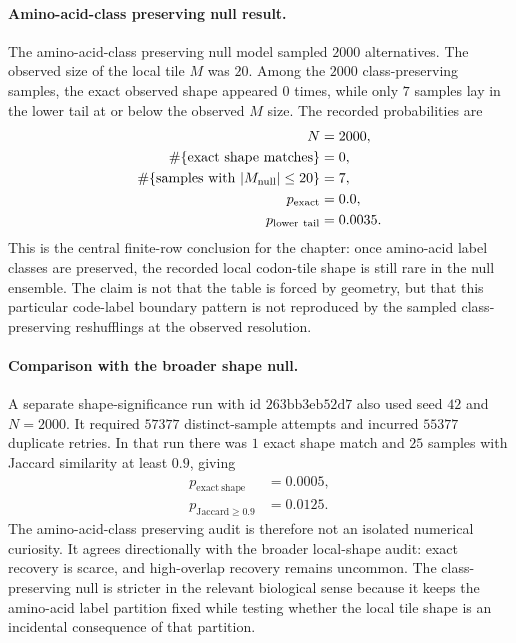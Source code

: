 \paragraph{Amino-acid-class preserving null result.}
The amino-acid-class preserving null model sampled $2000$ alternatives.  The observed size of the local tile $M$ was $20$.  Among the $2000$ class-preserving samples, the exact observed shape appeared $0$ times, while only $7$ samples lay in the lower tail at or below the observed $M$ size.  The recorded probabilities are
$$
\begin{aligned}
N&=2000,\\
\#\{\hbox{exact shape matches}\}&=0,\\
\#\{\hbox{samples with } |M_{\mathrm{null}}|\leq 20\}&=7,\\
p_{\mathrm{exact}}&=0.0,\\
p_{\mathrm{lower\ tail}}&=0.0035.
\end{aligned}
$$
This is the central finite-row conclusion for the chapter: once amino-acid label classes are preserved, the recorded local codon-tile shape is still rare in the null ensemble.  The claim is not that the table is forced by geometry, but that this particular code-label boundary pattern is not reproduced by the sampled class-preserving reshufflings at the observed resolution.

\paragraph{Comparison with the broader shape null.}
A separate shape-significance run with id $\mathrm{263bb3eb52d7}$ also used seed $42$ and $N=2000$.  It required $57377$ distinct-sample attempts and incurred $55377$ duplicate retries.  In that run there was $1$ exact shape match and $25$ samples with Jaccard similarity at least $0.9$, giving
$$
\begin{aligned}
p_{\mathrm{exact\ shape}}&=0.0005,\\
p_{\mathrm{Jaccard}\geq 0.9}&=0.0125.
\end{aligned}
$$
The amino-acid-class preserving audit is therefore not an isolated numerical curiosity.  It agrees directionally with the broader local-shape audit: exact recovery is scarce, and high-overlap recovery remains uncommon.  The class-preserving null is stricter in the relevant biological sense because it keeps the amino-acid label partition fixed while testing whether the local tile shape is an incidental consequence of that partition.

